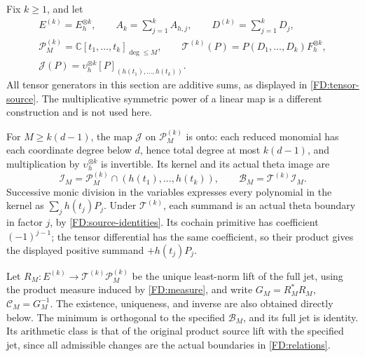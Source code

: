 Fix \(k\ge1\), and let
\begin{equation}
\begin{gathered}
E^{(k)}=E_h^{\otimes k},\qquad
A_k=\sum_{j=1}^k A_{h,j},\qquad D^{(k)}=\sum_{j=1}^kD_j,\\
\mathcal P_M^{(k)}=\mathbb C[t_1,\ldots,t_k]_{\deg\le M},\qquad
\mathcal T^{(k)}(P)=P(D_1,\ldots,D_k)F_h^{\otimes k},\\
\mathcal J(P)=\upsilon_h^{\otimes k}
[P]_{(h(t_1),\ldots,h(t_k))}.
\end{gathered}
\tag{FD.6}\label{FD:tensor-source}
\end{equation}
All tensor generators in this section are additive sums, as displayed in
\eqref{FD:tensor-source}.  The multiplicative symmetric power of a linear
map is a different construction and is not used here.

For \(M\ge k(d-1)\), the map \(\mathcal J\) on
\(\mathcal P_M^{(k)}\) is onto: each reduced monomial has each coordinate
degree below \(d\), hence total degree at most \(k(d-1)\), and multiplication
by \(\upsilon_h^{\otimes k}\) is invertible.  Its kernel and its actual
theta image are
\begin{equation}
\mathcal I_M=\mathcal P_M^{(k)}\cap(h(t_1),\ldots,h(t_k)),\qquad
\mathcal B_M=\mathcal T^{(k)}\mathcal I_M.
\tag{FD.7}\label{FD:relations}
\end{equation}
Successive monic division in the variables expresses every polynomial in
the kernel as \(\sum_jh(t_j)P_j\).  Under \(\mathcal T^{(k)}\), each
summand is an actual theta boundary in factor \(j\), by
\eqref{FD:source-identities}.  Its cochain primitive has coefficient
\((-1)^{j-1}\); the tensor differential has the same coefficient, so their
product gives the displayed positive summand \(+h(t_j)P_j\).

Let \(R_M:E^{(k)}\to\mathcal T^{(k)}\mathcal P_M^{(k)}\) be the unique
least-norm lift of the full jet, using the product measure induced by
\eqref{FD:measure}, and write
\(G_M=R_M^*R_M\), \(\mathcal C_M=G_M^{-1}\).
The existence, uniqueness, and inverse are also obtained directly below.
The minimum is orthogonal to the specified \(\mathcal B_M\), and its
full jet is identity.  Its arithmetic class is that of the original
product source lift with the specified jet, since all admissible
changes are the actual boundaries in \eqref{FD:relations}.

